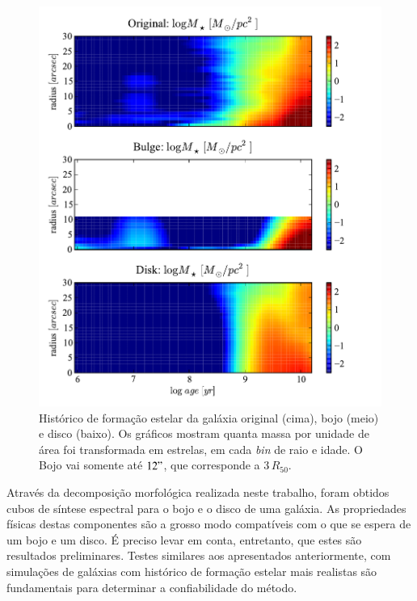 \begin{figure}
	\includegraphics{figuras/decomp-sfh}
	\caption[Histórico de formação estelar do bojo, disco, e total] {Histórico de
	formação estelar da galáxia original (cima), bojo (meio) e disco (baixo). Os
	gráficos mostram quanta massa por unidade de área foi transformada em estrelas,
	em cada {\em bin} de raio e idade. O Bojo vai somente até $12"$, que
	corresponde a $3\,R_{50}$.}
	\label{fig:decompSynSfh}
\end{figure}

Através da decomposição morfológica realizada neste trabalho, foram obtidos
cubos de síntese espectral para o bojo e o disco de uma galáxia. As propriedades
físicas destas componentes são a grosso modo compatíveis com o que se espera de
um bojo e um disco. É preciso levar em conta, entretanto, que estes são resultados
preliminares. Testes similares aos apresentados anteriormente, com simulações de
galáxias com histórico de formação estelar mais realistas são fundamentais para
determinar a confiabilidade do método.


